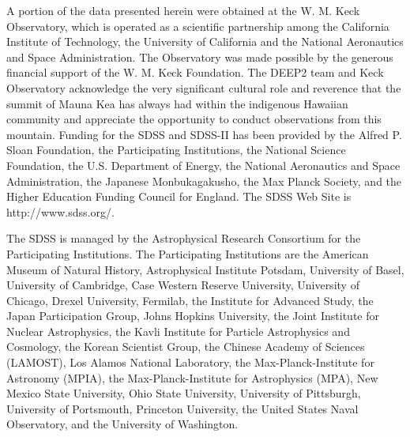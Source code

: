 \documentclass[12pt,preprint]{aastex}
\begin{document}
A portion of the data presented herein were obtained at the W. M. Keck
Observatory, which is operated as a scientific partnership among the California
Institute of Technology, the University of California and the National
Aeronautics and Space Administration. The Observatory was made possible by the
generous financial support of the W. M. Keck Foundation. The DEEP2 team and
Keck Observatory acknowledge the very significant cultural role and reverence
that the summit of Mauna Kea has always had within the indigenous Hawaiian
community and appreciate the opportunity to conduct observations from this
mountain.  Funding for the SDSS and SDSS-II has been provided by the Alfred P.
Sloan Foundation, the Participating Institutions, the National Science
Foundation, the U.S. Department of Energy, the National Aeronautics and Space
Administration, the Japanese Monbukagakusho, the Max Planck Society, and the
Higher Education Funding Council for England. The SDSS Web Site is
http://www.sdss.org/.

The SDSS is managed by the Astrophysical Research Consortium for the
Participating Institutions. The Participating Institutions are the American
Museum of Natural History, Astrophysical Institute Potsdam, University of
Basel, University of Cambridge, Case Western Reserve University, University of
Chicago, Drexel University, Fermilab, the Institute for Advanced Study, the
Japan Participation Group, Johns Hopkins University, the Joint Institute for
Nuclear Astrophysics, the Kavli Institute for Particle Astrophysics and
Cosmology, the Korean Scientist Group, the Chinese Academy of Sciences
(LAMOST), Los Alamos National Laboratory, the Max-Planck-Institute for
Astronomy (MPIA), the Max-Planck-Institute for Astrophysics (MPA), New Mexico
State University, Ohio State University, University of Pittsburgh, University
of Portsmouth, Princeton University, the United States Naval Observatory, and
the University of Washington.






\end{document}
